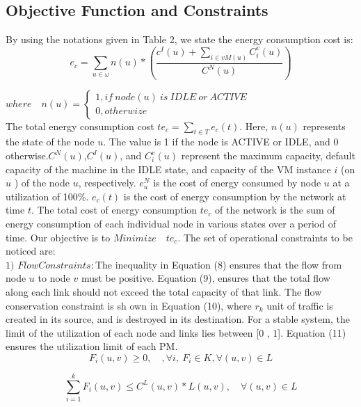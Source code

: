\documentclass[12pt]{article}
\begin{document}
\subsection{Objective Function and Constraints}

By using the notations given in Table 2, we state the
energy consumption cost is:
\begin{equation}
e_c=\sum_{u\in\omega}n(u)*(\frac{c^I(u)+\sum_{i\in{vM(u)}}C_i^v(u)}{C^N(u)})
\end{equation}

$where \quad n(u)=
			\begin{cases}
				1,if\  node(u) \ is\  IDLE\  or\  ACTIVE\\
				0,otherwize
			\end{cases}
$	
\\
The total energy consumption cost $te_c=\sum_{t\in{T}}e_c(t)$. Here,
$n(u)$ represents the state of the node $u$. The value is 1 if the
node is ACTIVE or IDLE, and 0 otherwise.$C^N(u)$,$C^I(u)$,
and $C_i^v(u)$ represent the maximum capacity, default capacity
of the machine in the IDLE state, and capacity of the VM
instance $i$ (on $u$ ) of the node $u$, respectively. $e_u^N$ is the cost of
energy consumed by node $u$ at a utilization of 100\%. $e_c(t)$ is
the cost of energy consumption by the network at time $t$. The
total cost of energy  consumption $te_c$ of the network is the sum
of energy consumption of each individual node in various
states over a period of time. Our objective is to $Minimize \quad te_c$. The set of operational constraints to be
noticed are:		
\\
$1)$ $Flow Constraints:$The inequality in Equation (8) ensures
that the flow from node $u$ to node $v$ must be positive.
Equation (9), ensures that the total flow along each link should
not exceed the total capacity of that link. The flow
conservation constraint is sh own in Equation (10), where $r_k$
unit of traffic is created in its source, and is destroyed in its
destination. For a stable system, the limit of the utilization of
each node and links lies between [0 , 1]. Equation (11) ensures
the utilization limit of each PM.
\begin{equation}
F_i(u,v)\geq 0 ,\quad , \forall i , \ F_i \in K,\forall (u,v) \in L
\end{equation}


\begin{equation}
\sum_{i=1}^k F_i(u,v) \leq C^L(u,v)*L(u,v),\quad \forall (u,v) \in L
\end{equation}
\end{document}
